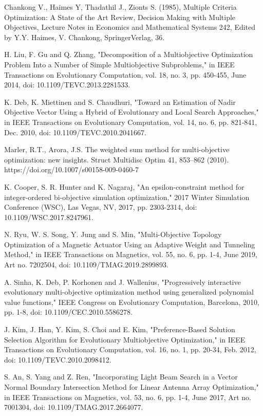 \documentclass[conference]{IEEEtran}
\begin{document}
\begin{thebibliography}{00}
 Chankong V., Haimes Y, Thadathil J., Zionts S. (1985), Multiple Criteria Optimization: A State of the Art Review, Decision Making with Multiple Objectives, Lecture Notes in Economics and Mathematical Systems 242, Edited by Y.Y. Haimes, V. Chankong, SpringerVerlag, 36.

 H. Liu, F. Gu and Q. Zhang, "Decomposition of a Multiobjective Optimization Problem Into a Number of Simple Multiobjective Subproblems," in IEEE Transactions on Evolutionary Computation, vol. 18, no. 3, pp. 450-455, June 2014, doi: 10.1109/TEVC.2013.2281533. 

 K. Deb, K. Miettinen and S. Chaudhuri, "Toward an Estimation of Nadir Objective Vector Using a Hybrid of Evolutionary and Local Search Approaches," in IEEE Transactions on Evolutionary Computation, vol. 14, no. 6, pp. 821-841, Dec. 2010, doi: 10.1109/TEVC.2010.2041667.

 Marler, R.T., Arora, J.S. The weighted sum method for multi-objective optimization: new insights. Struct Multidisc Optim 41, 853–862 (2010). https://doi.org/10.1007/s00158-009-0460-7

 K. Cooper, S. R. Hunter and K. Nagaraj, "An epsilon-constraint method for integer-ordered bi-objective simulation optimization," 2017 Winter Simulation Conference (WSC), Las Vegas, NV, 2017, pp. 2303-2314, doi: 10.1109/WSC.2017.8247961.

 N. Ryu, W. S. Song, Y. Jung and S. Min, "Multi-Objective Topology Optimization of a Magnetic Actuator Using an Adaptive Weight and Tunneling Method," in IEEE Transactions on Magnetics, vol. 55, no. 6, pp. 1-4, June 2019, Art no. 7202504, doi: 10.1109/TMAG.2019.2899893.

 A. Sinha, K. Deb, P. Korhonen and J. Wallenius, "Progressively interactive evolutionary multi-objective optimization method using generalized polynomial value functions," IEEE Congress on Evolutionary Computation, Barcelona, 2010, pp. 1-8, doi: 10.1109/CEC.2010.5586278.

 J. Kim, J. Han, Y. Kim, S. Choi and E. Kim, "Preference-Based Solution Selection Algorithm for Evolutionary Multiobjective Optimization," in IEEE Transactions on Evolutionary Computation, vol. 16, no. 1, pp. 20-34, Feb. 2012, doi: 10.1109/TEVC.2010.2098412.

 S. An, S. Yang and Z. Ren, "Incorporating Light Beam Search in a Vector Normal Boundary Intersection Method for Linear Antenna Array Optimization," in IEEE Transactions on Magnetics, vol. 53, no. 6, pp. 1-4, June 2017, Art no. 7001304, doi: 10.1109/TMAG.2017.2664077.


\end{thebibliography}
\end{document}
